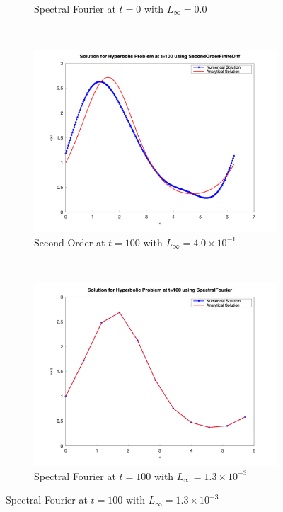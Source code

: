 \begin{figure}[H]
\begin{subfigure}{0.5\textwidth}
		\caption{Spectral Fourier at $t=0$ with $L_\infty=0.0$}
		\label{sfig:sublabel2}
	\end{subfigure}\\
	\begin{subfigure}{0.5\textwidth}
		\includegraphics[width=\textwidth]{media/hyperbolic_SecondOrderFiniteDiff_100.png}
		\caption{Second Order at $t=100$ with $L_\infty = 4.0 \times 10^{-1}$}
		\label{sfig:sublabel3}
	\end{subfigure}%
	~
	\begin{subfigure}{0.5\textwidth}
		\includegraphics[width=\textwidth]{media/hyperbolic_SpectralFourier_100.png}
		\caption{Spectral Fourier at $t=100$ with $L_\infty = 1.3 \times 10^{-3}
			$}
		\label{sfig:sublabel4}

\end{subfigure}
\end{figure}
